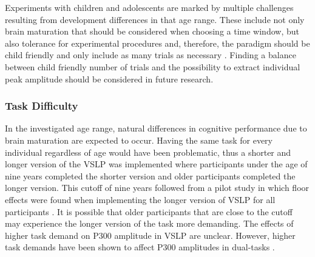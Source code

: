 Experiments with children and adolescents are marked by multiple challenges resulting from development differences in that age range. These include not only brain maturation that should be considered when choosing a time window, but also tolerance for experimental procedures and, therefore, the paradigm should be child friendly and only include as many trials as necessary \parencite{brookerConductingEventRelatedPotential2020}. Finding a balance between child friendly number of trials and the possibility to extract individual peak amplitude should be considered in future research. 
\subsubsection{Task Difficulty}
In the investigated age range, natural differences in cognitive performance due to brain maturation are expected to occur. Having the same task for every individual regardless of age would have been problematic, thus a shorter and longer version of the VSLP was implemented where participants under the age of nine years completed the shorter version and older participants completed the longer version. This cutoff of nine years followed from a pilot study in which floor effects were found when implementing the longer version of VSLP for all participants \parencite{langerResourceAssessingInformation2017}. It is possible that older participants that are close to the cutoff may experience the longer version of the task more demanding. The effects of higher task demand on P300 amplitude in VSLP are unclear. However, higher task demands have been shown to affect P300 amplitudes in dual-tasks \parencite{isrealP300TrackingDifficulty1980,wickensPerformanceConcurrentTasks1983}. 

